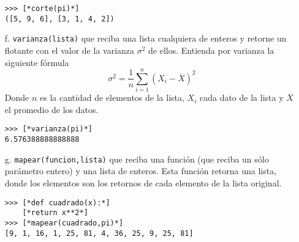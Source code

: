 \begin{itemize}
\begin{lstlisting}[style=consola]
>>> [*corte(pi)*]
([5, 9, 6], [3, 1, 4, 2])
\end{lstlisting}

    \item[f.] \texttt{varianza(lista)} que reciba una lista cualquiera de enteros y retorne un flotante con el valor de la varianza $\sigma ^2$ de ellos. Entienda por varianza la siguiente fórmula
    \begin{equation*}
        \sigma^2=\frac{1}{n} \sum^{n}_{i=1} (X_{i} - \overline{X})^2
    \end{equation*}
    Donde $n$ es la cantidad de elementos de la lista, $X_i$ cada dato de la lista y $\overline{X}$ el promedio de los datos.
    
\begin{lstlisting}[style=consola]
>>> [*varianza(pi)*]
6.576388888888888
\end{lstlisting}

    \item[g.] \texttt{mapear(funcion,lista)} que reciba una función (que reciba un sólo parámetro entero) y una lista de enteros. Esta función retorna una lista, donde los elementos son los retornos de cada elemento de la lista original.

\begin{lstlisting}[style=consola]
>>> [*def cuadrado(x):*]
	[*return x**2*]
>>> [*mapear(cuadrado,pi)*]
[9, 1, 16, 1, 25, 81, 4, 36, 25, 9, 25, 81]
\end{lstlisting}
    
    
\end{itemize}